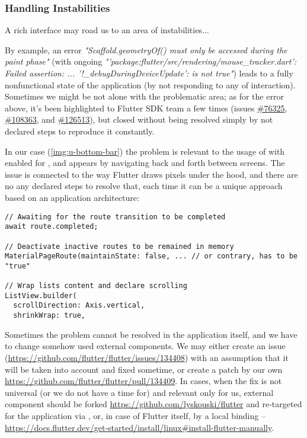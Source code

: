\subsubsection{Handling Instabilities}

A rich interface may road us to an area of instabilities...

By example, an error \emph{"Scaffold.geometryOf() must only be accessed during the paint phase"} (with ongoing 
\emph{"'package:flutter/src/rendering/mouse\_tracker.dart': Failed assertion: ... '!\_debugDuringDeviceUpdate': 
is not true"}) leads to a fully nonfunctional state  of the application (by not responding to any of interaction).
Sometimes we might be not alone with the problematic area; as for the error above, it's been highlighted to Flutter 
SDK team a few times (issues \href{https://github.com/flutter/flutter/issues/76325}{\#76325},
\href{https://github.com/flutter/flutter/issues/108363}{\#108363}, and
\href{https://github.com/flutter/flutter/issues/126513}{\#126513}), but closed without being resolved simply by not 
declared steps to reproduce it constantly.


In our case (\cref{img:u-bottom-bar}) the problem is relevant to the usage of  with enabled  for , and appears by 
navigating back and forth between screens. The issue is connected to the way Flutter draws pixels under the hood, and 
there are no any declared steps to resolve that, each time it can be a unique approach based on an application 
architecture:

\begin{lstlisting}
// Awaiting for the route transition to be completed
await route.completed;

// Deactivate inactive routes to be remained in memory
MaterialPageRoute(maintainState: false, ... // or contrary, has to be "true"

// Wrap lists content and declare scrolling
ListView.builder(
  scrollDirection: Axis.vertical,
  shrinkWrap: true,
\end{lstlisting}

Sometimes the problem cannot be resolved in the application itself, and we have to change somehow used external 
components. We may either create an issue 
(\href{https://github.com/flutter/flutter/issues/134408}{https://github.com/flutter/flutter/issues/134408}) 
with an assumption that it will be taken into account and fixed sometime, or create a patch by our own 
\href{https://github.com/flutter/flutter/pull/134409}{https://github.com/flutter/flutter/pull/134409}. In cases, when 
the fix is not universal (or we do not have a time for) and relevant only for us, external component should be forked 
\href{https://github.com/lyskouski/flutter}{https://github.com/lyskouski/flutter} and re-targeted for the application
via , or, in case of Flutter itself, by a local binding -- 
\href{https://docs.flutter.dev/get-started/install/linux#install-flutter-manually}{https://docs.flutter.dev/get-started/install/linux\#install-flutter-manually}.
